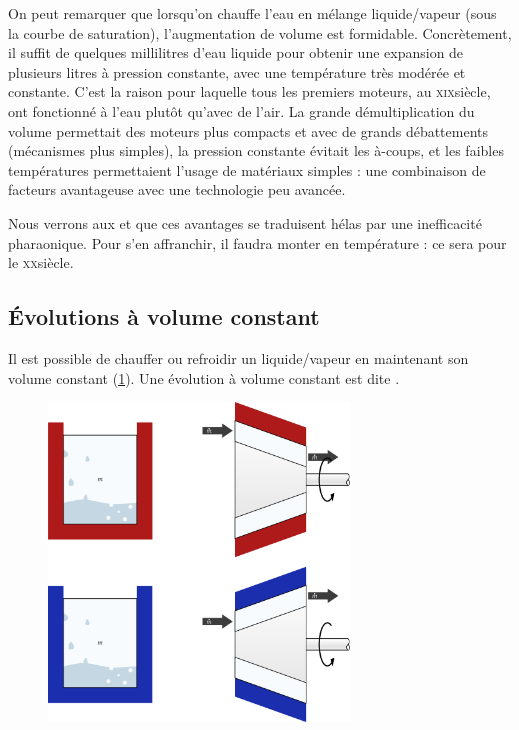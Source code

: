 		On peut remarquer que lorsqu’on chauffe l’eau en mélange liquide/vapeur (sous la courbe de saturation), l’augmentation de volume est formidable. Concrètement, il suffit de quelques millilitres d’eau liquide pour obtenir une expansion de plusieurs litres à pression constante, avec une température très modérée et constante. C’est la raison pour laquelle tous les premiers moteurs, au \textsc{xix}\ieme siècle, ont fonctionné à l’eau plutôt qu’avec de l’air. La grande démultiplication du volume permettait des moteurs plus compacts et avec de grands débattements (mécanismes plus simples), la pression constante évitait les à-coups, et les faibles températures permettaient l’usage de matériaux simples : une combinaison de facteurs avantageuse avec une technologie peu avancée.
		
		Nous verrons aux \courssept et \coursneuf que ces avantages se traduisent hélas par une inefficacité
pharaonique. Pour s’en affranchir, il faudra monter en température : ce sera pour le \textsc{xx}\ieme siècle.


	\subsection{Évolutions à volume constant}
	\label{ch_lv_isochores}

		Il est possible de chauffer ou refroidir un liquide/vapeur en maintenant son volume constant (\cref{fig_lv_isochore}). Une évolution à volume constant est dite .

		\begin{figure}
			\begin{center}
				\includegraphics[width=8cm]{images/lv_isochore.png}
			\end{center}
			\label{fig_lv_isochore}
		\end{figure}
		
